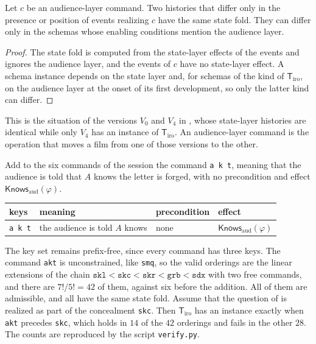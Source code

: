 \begin{proposition}\label{prop:audfold}
Let $c$ be an audience-layer command. Two histories that differ only in the presence or position of events realizing $c$ have the same state fold. They can differ only in the schemas whose enabling conditions mention the audience layer.
\end{proposition}

\begin{proof}
The state fold is computed from the state-layer effects of the events and ignores the audience layer, and the events of $c$ have no state-layer effect. A schema instance depends on the state layer and, for schemas of the kind of $\mathsf{T}_{\mathrm{iro}}$, on the audience layer at the onset of its first development, so only the latter kind can differ.
\end{proof}

This is the situation of the versions $V_0$ and $V_4$ in , whose state-layer histories are identical while only $V_4$ has an instance of $\mathsf{T}_{\mathrm{iro}}$. An audience-layer command is the operation that moves a film from one of those versions to the other.

\begin{example}\label{ex:audsession}
Add to the six commands of the session the command \texttt{a k t}, meaning that the audience is told that $A$ knows the letter is forged, with no precondition and effect $\mathsf{Knows}_{\mathrm{aud}}(\varphi)$.
\begin{center}
\small
\begin{tabular}{p{1.0cm}p{3.3cm}p{3.7cm}p{3.1cm}}
\toprule
keys & meaning & precondition & effect\\
\midrule
\texttt{a k t} & the audience is told $A$ knows & none & $\mathsf{Knows}_{\mathrm{aud}}(\varphi)$\\
\bottomrule
\end{tabular}
\end{center}
The key set remains prefix-free, since every command has three keys. The command \texttt{akt} is unconstrained, like \texttt{smq}, so the valid orderings are the linear extensions of the chain $\texttt{skl}<\texttt{skc}<\texttt{skr}<\texttt{grb}<\texttt{sdx}$ with two free commands, and there are $7!/5!=42$ of them, against six before the addition. All of them are admissible, and all have the same state fold. Assume that the question of  is realized as part of the concealment \texttt{skc}. Then $\mathsf{T}_{\mathrm{iro}}$ has an instance exactly when \texttt{akt} precedes \texttt{skc}, which holds in $14$ of the $42$ orderings and fails in the other $28$. The counts are reproduced by the script \texttt{verify.py}.
\end{example}

